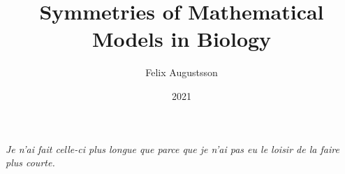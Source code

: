 \documentclass[a4paper, 11pt, twoside, openright]{report}
\title{Symmetries of Mathematical Models in Biology}
\author{Felix Augustsson}
\date{2021}
\begin{document}
\maketitle




\cleardoublepage
\thispagestyle{empty}
\null\vfill
\begin{center}
  \parbox{.5\textwidth}{%
    \raggedright{\itshape\large%
      Je n'ai fait celle-ci plus longue que parce que je n'ai pas eu le loisir de la faire plus courte.\par
    }
    \par%
  }
\end{center}
\vfill\vfill
\cleardoublepage

\tableofcontents

\cleardoublepage
{}
\setcounter{page}{1}















\appendix



\printbibliography[heading=bibintoc]
\end{document}
